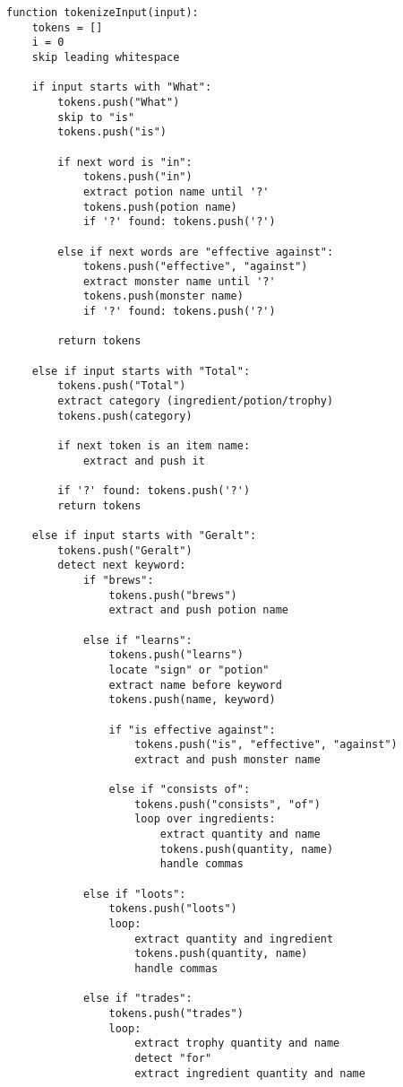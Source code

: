 \documentclass{article}
\begin{document}
\begin{verbatim}
function tokenizeInput(input):
    tokens = []
    i = 0
    skip leading whitespace

    if input starts with "What":
        tokens.push("What")
        skip to "is"
        tokens.push("is")

        if next word is "in":
            tokens.push("in")
            extract potion name until '?'
            tokens.push(potion name)
            if '?' found: tokens.push('?')

        else if next words are "effective against":
            tokens.push("effective", "against")
            extract monster name until '?'
            tokens.push(monster name)
            if '?' found: tokens.push('?')

        return tokens

    else if input starts with "Total":
        tokens.push("Total")
        extract category (ingredient/potion/trophy)
        tokens.push(category)

        if next token is an item name:
            extract and push it

        if '?' found: tokens.push('?')
        return tokens

    else if input starts with "Geralt":
        tokens.push("Geralt")
        detect next keyword:
            if "brews":
                tokens.push("brews")
                extract and push potion name

            else if "learns":
                tokens.push("learns")
                locate "sign" or "potion"
                extract name before keyword
                tokens.push(name, keyword)

                if "is effective against":
                    tokens.push("is", "effective", "against")
                    extract and push monster name

                else if "consists of":
                    tokens.push("consists", "of")
                    loop over ingredients:
                        extract quantity and name
                        tokens.push(quantity, name)
                        handle commas

            else if "loots":
                tokens.push("loots")
                loop:
                    extract quantity and ingredient
                    tokens.push(quantity, name)
                    handle commas

            else if "trades":
                tokens.push("trades")
                loop:
                    extract trophy quantity and name
                    detect "for"
                    extract ingredient quantity and name


\end{verbatim}
\end{document}
